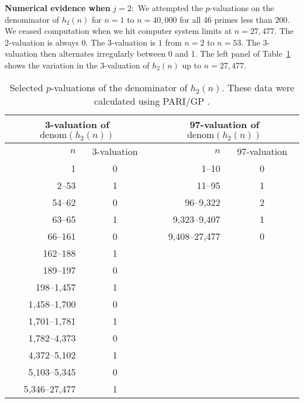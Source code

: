 \documentclass{article}
\theoremstyle{theorem}
\theoremstyle{definition}
\begin{document}
\bigskip

\textbf{Numerical evidence when }$j=2:$ We attempted the $p$-valuations on
the denominator of $h_{2}\left( n\right) $ for $n=1$ to $n=40,000$ for all
46 primes less than $200$. We ceased computation when we hit computer system
limits at $n=27,477.$ The $2$-valuation is always $0$. The $3$-valuation is $%
1 $ from $n=2$ to $n=53$. The $3$-valuation then alternates irregularly
between 0 and 1. The left panel of Table~\ref{tab:p-vals-of-H2} shows the
variation in the 3-valuation of $h_{2}\left( n\right) $ up to $n=27,477$.


\begin{table}[h]\small
\begin{center}
\label{tab:p-vals-of-H2}\centering
\begin{tabular}{rc|rc}
\hline\hline 
\multicolumn{2}{c|}{3-valuation of $\mbox{denom}(h_2\left(n\right))$} & 
\multicolumn{2}{c}{97-valuation of $\mbox{denom}(h_2\left(n\right))$} \\ \hline
$n$           & 3-valuation & $n$           & 97-valuation \\ \hline\hline
1             & 0           & 1--10         & 0            \\ 
2--53         & 1           & 11--95        & 1            \\ 
54--62        & 0           & 96--9,322     & 2            \\ 
63--65        & 1           & 9,323--9,407  & 1            \\ 
66--161       & 0           & 9,408--27,477 & 0            \\ 
162--188      & 1           &               &              \\ 
189--197      & 0           &               &              \\ 
198--1,457    & 1           &               &              \\ 
1,458--1,700  & 0           &               &              \\ 
1,701--1,781  & 1           &               &              \\ 
1,782--4,373  & 0           &               &              \\ 
4,372--5,102  & 1           &               &              \\ 
5,103--5,345  & 0           &               &              \\ 
5,346--27,477 & 1           &               & 
\end{tabular}
\caption{Selected $p$-valuations of the denominator of $h_2\left(n\right)$. These data were calculated using PARI/GP \cite{Pa}.}
\end{center}
\end{table}
\end{document}

